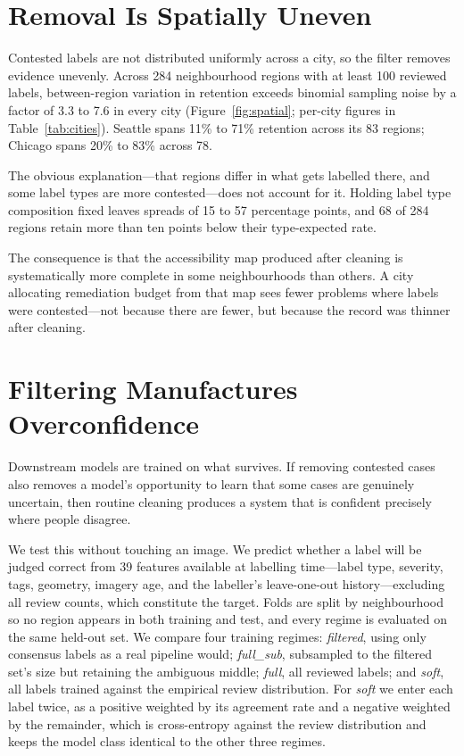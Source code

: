 \documentclass[sigconf]{acmart}
\begin{document}
\section{Removal Is Spatially Uneven}
\label{sec:spatial}

Contested labels are not distributed uniformly across a city, so the filter
removes evidence unevenly. Across 284 neighbourhood regions with at least 100
reviewed labels, between-region variation in retention exceeds binomial
sampling noise by a factor of 3.3 to 7.6 in every city
(Figure~\ref{fig:spatial}; per-city figures in Table~\ref{tab:cities}). Seattle spans 11\% to
71\% retention across its 83 regions; Chicago spans 20\% to 83\% across 78.

The obvious explanation---that regions differ in what gets labelled there, and
some label types are more contested---does not account for it. Holding label
type composition fixed leaves spreads of 15 to 57 percentage points, and 68 of
284 regions retain more than ten points below their type-expected rate.

The consequence is that the accessibility map produced after cleaning is
systematically more complete in some neighbourhoods than others. A city
allocating remediation budget from that map sees fewer problems where labels
were contested---not because there are fewer, but because the record was thinner
after cleaning.

\section{Filtering Manufactures Overconfidence}
\label{sec:calibration}

Downstream models are trained on what survives. If removing contested cases also
removes a model's opportunity to learn that some cases are genuinely uncertain,
then routine cleaning produces a system that is confident precisely where people
disagree.

We test this without touching an image. We predict whether a label will be
judged correct from 39 features available at labelling time---label type,
severity, tags, geometry, imagery age, and the labeller's leave-one-out
history---excluding all review counts, which constitute the target. Folds are
split by neighbourhood so no region appears in both training and test, and every
regime is evaluated on the same held-out set. We compare four training regimes:
\emph{filtered}, using only consensus labels as a real pipeline would;
\emph{full\_sub}, subsampled to the filtered set's size but retaining the
ambiguous middle; \emph{full}, all reviewed labels; and \emph{soft}, all labels trained against
the empirical review distribution. For \emph{soft} we enter each label twice,
as a positive weighted by its agreement rate and a negative weighted by the
remainder, which is cross-entropy against the review distribution and keeps the
model class identical to the other three regimes.
\end{document}
